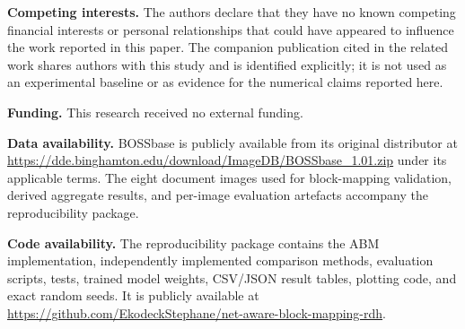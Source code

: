 \documentclass[a4paper,fleqn]{cas-dc}
\begin{document}
\medskip
\noindent\textbf{Competing interests.}
The authors declare that they have no known competing financial interests or
personal relationships that could have appeared to influence the work
reported in this paper. The companion publication cited in the related work
shares authors with this study and is identified explicitly; it is not used
as an experimental baseline or as evidence for the numerical claims reported
here.

\medskip
\noindent\textbf{Funding.}
This research received no external funding.

\medskip
\noindent\textbf{Data availability.}
BOSSbase is publicly available from its original distributor at
\url{https://dde.binghamton.edu/download/ImageDB/BOSSbase_1.01.zip} under its
applicable terms. The eight document images used for block-mapping validation,
derived aggregate results, and per-image evaluation artefacts accompany the
reproducibility package.

\medskip
\noindent\textbf{Code availability.}
The reproducibility package contains the ABM implementation, independently
implemented comparison methods, evaluation scripts, tests, trained model
weights, CSV/JSON result tables, plotting code, and exact random seeds. It is
publicly available at
\url{https://github.com/EkodeckStephane/net-aware-block-mapping-rdh}.



\end{document}
